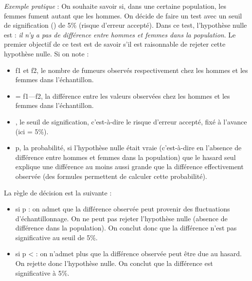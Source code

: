 \documentclass[10pt, oneside, a4paper]{article}
\begin{document}
\vspace{+0.5cm}\hspace{-0.5 cm}\textit{Exemple pratique} :  On souhaite savoir si, dans une certaine population, les femmes fument autant que les hommes. On décide de faire un test avec un seuil de signification (\alpha) de 5\% (risque d'erreur accepté). Dans ce test, l'hypothèse nulle est : \textit{il n'y a pas de différence entre hommes et femmes dans la population}. Le premier objectif de ce test est de savoir s'il est raisonnable de rejeter cette hypothèse nulle.
Si on note :
\begin{itemize}
\item f1 et f2, le nombre de fumeurs observés respectivement chez les hommes et les femmes dans l'échantillon.
\item {\delta} = f1—f2, la différence entre les valeurs observées chez les hommes et les femmes dans l'échantillon.
\item \alpha, le seuil de signification, c'est-à-dire le risque d'erreur accepté, fixé à l'avance (ici {\alpha} = 5\%).
\item p, la probabilité, si l'hypothèse nulle était vraie (c'est-à-dire en l'absence de différence entre hommes et femmes dans la population) que le hasard seul explique une différence au moins aussi grande que la différence {\delta} effectivement observée (des formules permettent de calculer cette probabilité).
\end{itemize}
La règle de décision est la suivante :
\begin{itemize}
\item si p {\geq} {\alpha} : on admet que la différence observée peut provenir des fluctuations d'échantillonnage. On ne peut pas rejeter l'hypothèse nulle (absence de différence dans la population). On conclut donc que la différence n'est pas significative au seuil de 5\%.
\item si p < {\alpha} : on n'admet plus que la différence observée peut être due au hasard. On rejette donc l'hypothèse nulle. On conclut que la différence est significative à 5\%. \\
\end{itemize}
\end{document}
